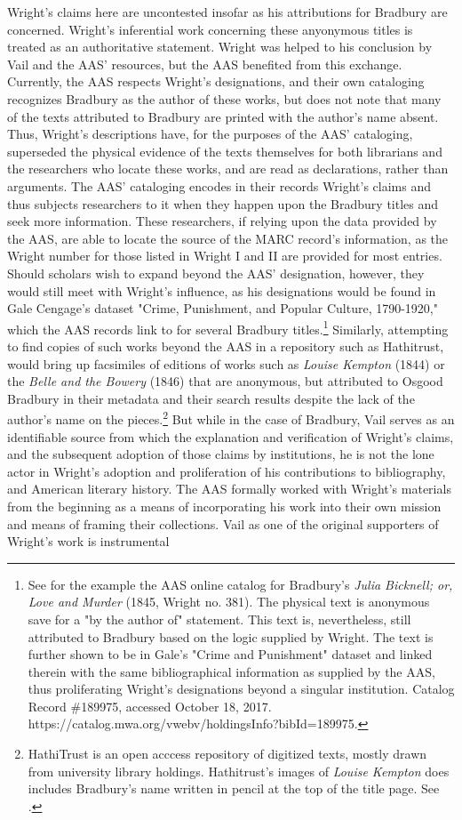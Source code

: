 Wright's claims here are uncontested insofar as his attributions for Bradbury are concerned. Wright's inferential work concerning these anyonymous titles is treated as an authoritative statement. Wright was helped to his conclusion by Vail and the AAS' resources, but the AAS benefited from this exchange. Currently, the AAS respects Wright's designations, and their own cataloging recognizes Bradbury as the author of these works, but does not note that many of the texts attributed to Bradbury are printed with the author's name absent. Thus, Wright's descriptions have, for the purposes of the AAS' cataloging, superseded the physical evidence of the texts themselves for both librarians and the researchers who locate these works, and are read as declarations, rather than arguments. The AAS' cataloging encodes in their records Wright's claims and thus subjects researchers to it when they happen upon the Bradbury titles and seek more information. These researchers, if relying upon the data provided by the AAS, are able to locate the source of the MARC record's information, as the Wright number for those listed in Wright I and II are provided for most entries. Should scholars wish to expand beyond the AAS' designation, however, they would still meet with Wright's influence, as his designations would be found in Gale Cengage's dataset "Crime, Punishment, and Popular Culture, 1790-1920," which the AAS records link to for several Bradbury titles.\footnote{See for the example the AAS online catalog for Bradbury's \textit{Julia Bicknell; or, Love and Murder} (1845, Wright no. 381). The physical text is anonymous save for a "by the author of" statement. This text is, nevertheless, still attributed to Bradbury based on the logic supplied by Wright. The text is further shown to be in Gale's "Crime and Punishment" dataset and linked therein with the same bibliographical information as supplied by the AAS, thus proliferating Wright's designations beyond a singular institution. Catalog Record \#189975, accessed October 18, 2017. https://catalog.mwa.org/vwebv/holdingsInfo?bibId=189975.} Similarly, attempting to find copies of such works beyond the AAS in a repository such as Hathitrust, would bring up facsimiles of editions of works such as \textit{Louise Kempton} (1844) or the \textit{Belle and the Bowery} (1846) that are anonymous, but attributed to Osgood Bradbury in their metadata and their search results despite the lack of the author's name on the pieces.\footnote{HathiTrust is an open acccess repository of digitized texts, mostly drawn from university library holdings. Hathitrust's images of \textit{Louise Kempton} does includes Bradbury's name written in pencil at the top of the title page. See \autocite{bradbury_louise_1844}.} But while in the case of Bradbury, Vail serves as an identifiable source from which the explanation and verification of Wright's claims, and the subsequent adoption of those claims by institutions, he is not the lone actor in Wright's adoption and proliferation of his contributions to bibliography, and American literary history. The AAS formally worked with Wright's materials from the beginning as a means of incorporating his work into their own mission and means of framing their collections. Vail as one of the original supporters of Wright's work is instrumental 